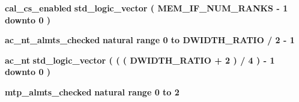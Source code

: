 \begin{DoxyCompactItemize}
\item 
{\bf cal\+\_\+cs\+\_\+enabled} {\bfseries \textcolor{comment}{std\+\_\+logic\+\_\+vector}\textcolor{vhdlchar}{ }\textcolor{vhdlchar}{(}\textcolor{vhdlchar}{ }\textcolor{vhdlchar}{ }\textcolor{vhdlchar}{ }\textcolor{vhdlchar}{ }{\bfseries {\bf M\+E\+M\+\_\+\+I\+F\+\_\+\+N\+U\+M\+\_\+\+R\+A\+N\+KS}} \textcolor{vhdlchar}{-\/}\textcolor{vhdlchar}{ } \textcolor{vhdldigit}{1} \textcolor{vhdlchar}{ }\textcolor{keywordflow}{downto}\textcolor{vhdlchar}{ }\textcolor{vhdlchar}{ } \textcolor{vhdldigit}{0} \textcolor{vhdlchar}{ }\textcolor{vhdlchar}{)}\textcolor{vhdlchar}{ }} 
\item 
{\bf ac\+\_\+nt\+\_\+almts\+\_\+checked} {\bfseries \textcolor{comment}{natural}\textcolor{vhdlchar}{ }\textcolor{vhdlchar}{ }\textcolor{vhdlchar}{ }\textcolor{keywordflow}{range}\textcolor{vhdlchar}{ }\textcolor{vhdlchar}{ } \textcolor{vhdldigit}{0} \textcolor{vhdlchar}{ }\textcolor{keywordflow}{to}\textcolor{vhdlchar}{ }\textcolor{vhdlchar}{ }\textcolor{vhdlchar}{ }\textcolor{vhdlchar}{ }{\bfseries {\bf D\+W\+I\+D\+T\+H\+\_\+\+R\+A\+T\+IO}} \textcolor{vhdlchar}{/}\textcolor{vhdlchar}{ } \textcolor{vhdldigit}{2} \textcolor{vhdlchar}{-\/}\textcolor{vhdlchar}{ } \textcolor{vhdldigit}{1} \textcolor{vhdlchar}{ }} 
\item 
{\bf ac\+\_\+nt} {\bfseries \textcolor{comment}{std\+\_\+logic\+\_\+vector}\textcolor{vhdlchar}{ }\textcolor{vhdlchar}{(}\textcolor{vhdlchar}{ }\textcolor{vhdlchar}{(}\textcolor{vhdlchar}{ }\textcolor{vhdlchar}{(}\textcolor{vhdlchar}{ }\textcolor{vhdlchar}{ }\textcolor{vhdlchar}{ }\textcolor{vhdlchar}{ }{\bfseries {\bf D\+W\+I\+D\+T\+H\+\_\+\+R\+A\+T\+IO}} \textcolor{vhdlchar}{+}\textcolor{vhdlchar}{ } \textcolor{vhdldigit}{2} \textcolor{vhdlchar}{ }\textcolor{vhdlchar}{)}\textcolor{vhdlchar}{ }\textcolor{vhdlchar}{/}\textcolor{vhdlchar}{ } \textcolor{vhdldigit}{4} \textcolor{vhdlchar}{ }\textcolor{vhdlchar}{)}\textcolor{vhdlchar}{ }\textcolor{vhdlchar}{-\/}\textcolor{vhdlchar}{ } \textcolor{vhdldigit}{1} \textcolor{vhdlchar}{ }\textcolor{keywordflow}{downto}\textcolor{vhdlchar}{ }\textcolor{vhdlchar}{ } \textcolor{vhdldigit}{0} \textcolor{vhdlchar}{ }\textcolor{vhdlchar}{)}\textcolor{vhdlchar}{ }} 
\item 
{\bf mtp\+\_\+almts\+\_\+checked} {\bfseries \textcolor{comment}{natural}\textcolor{vhdlchar}{ }\textcolor{vhdlchar}{ }\textcolor{vhdlchar}{ }\textcolor{keywordflow}{range}\textcolor{vhdlchar}{ }\textcolor{vhdlchar}{ } \textcolor{vhdldigit}{0} \textcolor{vhdlchar}{ }\textcolor{keywordflow}{to}\textcolor{vhdlchar}{ }\textcolor{vhdlchar}{ } \textcolor{vhdldigit}{2} \textcolor{vhdlchar}{ }} 

\end{DoxyCompactItemize}
